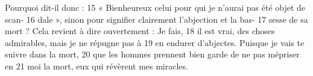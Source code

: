 Pourquoi dit-il donc :	 
15	 	« Bienheureux celui pour qui je n'aurai pas été objet de scan-	 
16	 	dale », sinon pour signifier clairement l'abjection et la bas-	 
17	 	sesse de sa mort ? Cela revient à dire ouvertement : Je fais,	 
18	 	il est vrai, des choses admirables, mais je ne répugne pas à	 
19	 	en endurer d'abjectes. Puisque je vais te suivre dans la mort,	 
20	 	que les hommes prennent bien garde de ne pas mépriser en	 
21	 	moi la mort, eux qui révèrent mes miracles.